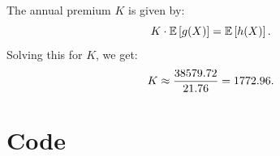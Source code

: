 \documentclass[a4paper]{article}
\theoremstyle{definition}
\begin{document}
The annual premium $K$ is given by:
\begin{equation}
  \notag
  K \cdot \mathbb{E}\left[ g(X) \right] = \mathbb{E}\left[ h(X) \right].
\end{equation}
Solving this for $K$, we get:
\begin{equation}
  \notag
  K \approx \frac{38579.72}{21.76} = 1772.96.
\end{equation}

\section*{Code}
\inputminted[samepage=true]{python}{./src/point_probability.py}
\end{document}
